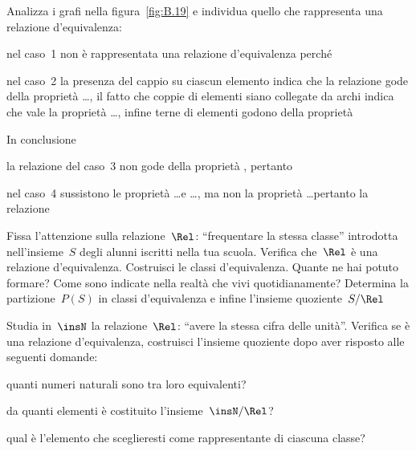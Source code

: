 \begin{multicols}{2}
\begin{esercizio}
\label{ese:B.31}
Analizza i grafi nella figura~\ref{fig:B.19} e individua quello che 
rappresenta una relazione d'equivalenza:
\begin{itemize*}
\item nel caso~1 non è rappresentata una relazione d'equivalenza perché 
 \dotfill
\item nel caso~2 la presenza del cappio su ciascun elemento indica che la 
relazione gode della proprietà \ldots,
il fatto che coppie di elementi siano collegate da archi indica che vale la 
proprietà \ldots, infine terne di elementi godono della proprietà \dotfill

In conclusione \dotfill
\item la relazione del caso~3 non gode della proprietà \dotfill, 
pertanto \dotfill
\item nel caso~4 sussistono le proprietà \ldots e \ldots, ma non la proprietà 
\ldots pertanto la relazione \dotfill
\end{itemize*}
\end{esercizio}

\begin{esercizio}
\label{ese:B.32}
Fissa l'attenzione sulla relazione~$\Rel$: ``frequentare la stessa classe'' 
introdotta nell'insieme~$S$ degli alunni iscritti nella tua scuola.
Verifica che~$\Rel$ è una relazione d'equivalenza. Costruisci le classi 
d'equivalenza. Quante ne hai potuto formare? Come sono indicate nella
realtà che vivi quotidianamente? Determina la partizione~$P(S)$ in classi 
d'equivalenza e infine l'insieme quoziente~$S/\Rel$
\end{esercizio}

\begin{esercizio}
\label{ese:B.33}
Studia in~$\insN$ la relazione~$\Rel$: ``avere la stessa cifra delle unità''. 
Verifica se è una relazione d'equivalenza, costruisci l'insieme quoziente 
dopo aver risposto alle seguenti domande:\vspace{-1ex}
\begin{itemize*}
\item quanti numeri naturali sono tra loro equivalenti?
\item da quanti elementi è costituito l'insieme~$\insN/\Rel$?
\item qual è l'elemento che sceglieresti come rappresentante di ciascuna 
 classe?
\end{itemize*}
\end{esercizio}


\end{multicols}
